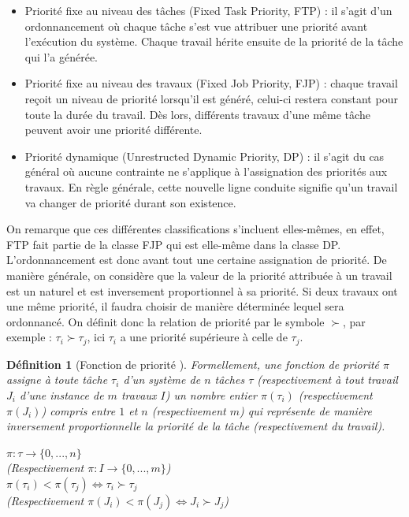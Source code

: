\documentclass[12pt,a4paper,oneside]{book}
\theoremstyle{break}
\newtheorem{defin}{Définition}[chapter]
\theoremstyle{breakplain}
\begin{document}
\begin{itemize}
\item Priorité fixe au niveau des tâches (Fixed Task Priority, FTP) : il s'agit d'un ordonnancement où chaque tâche s'est vue attribuer une priorité avant l'exécution du système. Chaque travail hérite ensuite de la priorité de la tâche qui l'a générée.
\item Priorité fixe au niveau des travaux (Fixed Job Priority, FJP) : chaque travail reçoit un niveau de priorité lorsqu'il est généré, celui-ci restera constant pour toute la durée du travail. Dès lors, différents travaux d'une même tâche peuvent avoir une priorité différente.
\item Priorité dynamique (Unrestructed Dynamic Priority, DP) : il s'agit du cas général où aucune contrainte ne s'applique à l'assignation des priorités aux travaux. En règle générale, cette nouvelle ligne conduite signifie qu'un travail va changer de priorité durant son existence.\\
\end{itemize}
On remarque que ces différentes classifications s'incluent elles-mêmes, en effet, FTP fait partie de la classe FJP qui est elle-même dans la classe DP.\\

L'ordonnancement est donc avant tout une certaine assignation de priorité. De manière générale, on considère que la valeur de la priorité attribuée à un travail est un naturel et est inversement proportionnel à sa priorité. Si deux travaux ont une même priorité, il faudra choisir de manière déterminée lequel sera ordonnancé. On définit donc la relation de priorité par le symbole $\succ$, par exemple : $\tau_i \succ \tau_j$, ici $\tau_i$ a une priorité supérieure à celle de $\tau_j$.\\

\begin{defin}[Fonction de priorité \cite{santy2012ordonnancement}]
Formellement, une fonction de priorité $\pi$ assigne à toute tâche $\tau_i$ d'un système de $n$ tâches $\tau$ (respectivement à tout travail $J_i$ d'une instance de $m$ travaux $I$) un nombre entier $\pi(\tau_i)$ (respectivement $\pi(J_i)$) compris entre $1$ et $n$ (respectivement $m$) qui représente de manière inversement proportionnelle la priorité de la tâche (respectivement du travail).
\begin{center}
$\pi : \tau \rightarrow \{0,...,n \}$\\
(Respectivement $\pi : I \rightarrow \{0,...,m \}$)\\
$\pi(\tau_i) < \pi(\tau_j) \Leftrightarrow \tau_i \succ \tau_j$\\
(Respectivement $\pi(J_i) < \pi(J_j) \Leftrightarrow J_i \succ J_j$)
\end{center}
\end{defin}
\end{document}

